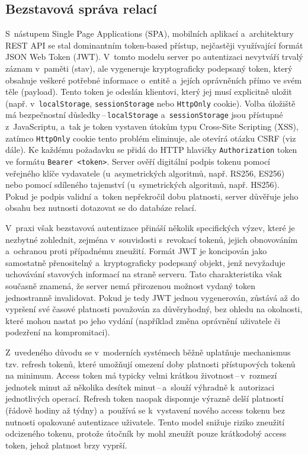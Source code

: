 \subsection{Bezstavová správa relací}
S~nástupem Single Page Applications (SPA), mobilních aplikací a~architektury REST API se stal dominantním token-based přístup, nejčastěji využívající formát JSON Web Token (JWT).
V~tomto modelu server po autentizaci nevytváří trvalý záznam v~paměti (stav), ale vygeneruje kryptograficky podepsaný token, který obsahuje veškeré potřebné informace o~entitě a~jejích oprávněních přímo ve svém těle (payload).
Tento token je odeslán klientovi, který jej musí explicitně uložit (např. v~\texttt{localStorage}, \texttt{sessionStorage} nebo \texttt{HttpOnly} cookie).
Volba úložiště má bezpečnostní důsledky\,--\,\texttt{localStorage} a~\texttt{sessionStorage} jsou přístupné z~JavaScriptu, a~tak je token vystaven útokům typu Cross-Site Scripting (XSS), zatímco \texttt{HttpOnly} cookie tento problém eliminuje, ale otevírá otázku CSRF (viz dále).
Ke každému požadavku se přidá do HTTP hlavičky \texttt{Authorization} token ve formátu \texttt{Bearer~<token>}. 
Server ověří digitální podpis tokenu pomocí veřejného klíče vydavatele (u~asymetrických algoritmů, např. RS256, ES256) nebo pomocí sdíleného tajemství (u~symetrických algoritmů, např. HS256).
Pokud je podpis validní a~token nepřekročil dobu platnosti, server důvěřuje jeho obsahu bez nutnosti dotazovat se do databáze relací.

V~praxi však bezstavová autentizace přináší několik specifických výzev, které je nezbytné zohlednit, zejména v~souvislosti s~revokací tokenů, jejich obnovováním a~ochranou proti případnému zneužití.
Formát JWT je koncipován jako samostatně přenositelný a~kryptograficky podepsaný objekt, jenž nevyžaduje uchovávání stavových informací na straně serveru.
Tato charakteristika však současně znamená, že server nemá přirozenou možnost vydaný token jednostranně invalidovat.
Pokud je tedy JWT jednou vygenerován, zůstává až do vypršení své časové platnosti považován za důvěryhodný, bez ohledu na okolnosti, které mohou nastat po jeho vydání (například změna oprávnění uživatele či podezření na kompromitaci).

Z~uvedeného důvodu se v~moderních systémech běžně uplatňuje mechanismus tzv. refresh tokenů, které umožňují omezení doby platnosti přístupových tokenů na minimum.
Access token má typicky velmi krátkou životnost\,--\,v~rozmezí jednotek minut až několika desítek minut\,--\,a~slouží výhradně k~autorizaci jednotlivých operací.
Refresh token naopak disponuje výrazně delší platností (řádově hodiny až týdny) a~používá se k~vystavení nového access tokenu bez nutnosti opakované autentizace uživatele.
Tento model snižuje riziko zneužití odcizeného tokenu, protože útočník by mohl zneužít pouze krátkodobý access token, jehož platnost brzy vyprší.

